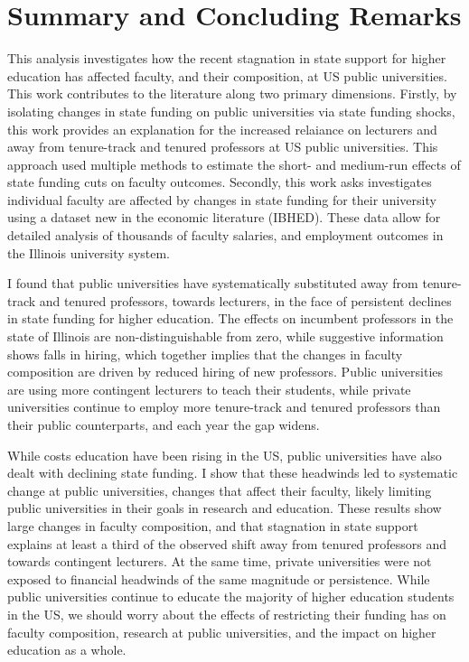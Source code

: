 \section{Summary and Concluding Remarks}
\label{sec:conclusion}

This analysis investigates how the recent stagnation in state support for higher education has affected faculty, and their composition, at US public universities.
This work contributes to the literature along two primary dimensions.
Firstly, by isolating changes in state funding on public universities via state funding shocks, this work provides an explanation for the increased relaiance on lecturers and away from tenure-track and tenured professors at US public universities.
This approach used multiple methods to estimate the short- and medium-run effects of state funding cuts on faculty outcomes.
Secondly, this work asks investigates individual faculty are affected by changes in state funding for their university using a dataset new in the economic literature (IBHED).
These data allow for detailed analysis of thousands of faculty salaries, and employment outcomes in the Illinois university system.

I found that public universities have systematically substituted away from tenure-track and tenured professors, towards lecturers, in the face of persistent declines in state funding for higher education.
The effects on incumbent professors in the state of Illinois are non-distinguishable from zero, while suggestive information shows falls in hiring, which together implies that the changes in faculty composition are driven by reduced hiring of new professors.
Public universities are using more contingent lecturers to teach their students, while private universities continue to employ more tenure-track and tenured professors than their public counterparts, and each year the gap widens.

While costs education have been rising in the US, public universities have also dealt with declining state funding.
I show that these headwinds led to systematic change at public universities, changes that affect their faculty, likely limiting public universities in their goals in research and education.
These results show large changes in faculty composition, and that stagnation in state support explains at least a third of the observed shift away from tenured professors and towards contingent lecturers.
At the same time, private universities were not exposed to financial headwinds of the same magnitude or persistence.
While public universities continue to educate the majority of higher education students in the US, we should worry about the effects of restricting their funding has on faculty composition, research at public universities, and the impact on higher education as a whole.
